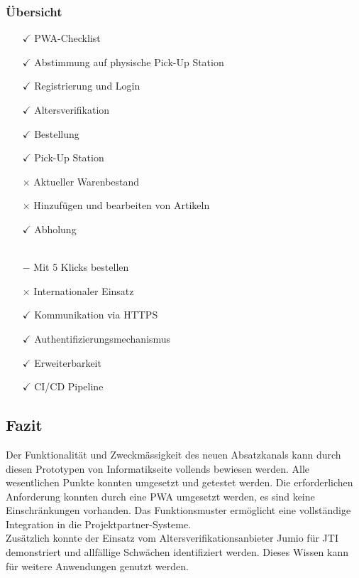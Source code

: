 \subsubsection{Übersicht}
\begin{itemize}
	\item [{$\checkmark$}] PWA-Checklist
	\item [{$\checkmark$}] Abstimmung auf physische Pick-Up Station
	\item [{$\checkmark$}] Registrierung und Login
	\item [{$\checkmark$}] Altersverifikation
	\item [{$\checkmark$}] Bestellung
	\item [{$\checkmark$}] Pick-Up Station
	\item [{$\times$}] Aktueller Warenbestand
	\item [{$\times$}] Hinzufügen und bearbeiten von Artikeln
	\item [{$\checkmark$}] Abholung\\\\
	\item [{$-$}] Mit 5 Klicks bestellen
	\item [{$\times$}] Internationaler Einsatz
	\item [{$\checkmark$}] Kommunikation via HTTPS
	\item [{$\checkmark$}] Authentifizierungsmechanismus
	\item [{$\checkmark$}] Erweiterbarkeit
	\item [{$\checkmark$}] CI/CD Pipeline
\end{itemize}
\subsection{Fazit}
Der Funktionalität und Zweckmässigkeit des neuen Absatzkanals kann durch diesen Prototypen von Informatikseite vollends bewiesen werden. Alle wesentlichen Punkte konnten umgesetzt und getestet werden. Die erforderlichen Anforderung konnten durch eine \gls{PWA} umgesetzt werden, es sind keine Einschränkungen vorhanden. Das Funktionsmuster ermöglicht eine vollständige Integration in die Projektpartner-Systeme. \\
Zusätzlich konnte der Einsatz vom Altersverifikationsanbieter Jumio für \ac{JTI} demonstriert und allfällige Schwächen identifiziert werden. Dieses Wissen kann für weitere Anwendungen genutzt werden. \\

\newpage